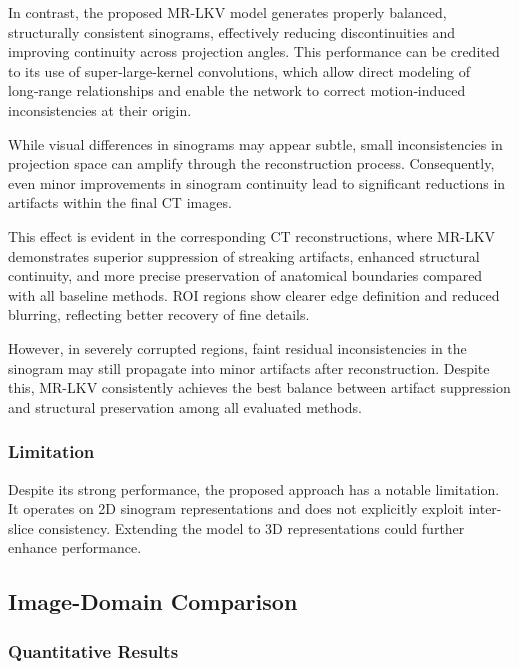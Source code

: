  In contrast, the proposed MR-LKV model generates properly balanced, structurally consistent sinograms, effectively reducing discontinuities and improving continuity across projection angles. This performance can be credited to its use of super‑large-kernel convolutions, which allow direct modeling of long‑range relationships and enable the network to correct motion‑induced inconsistencies at their origin.

 While visual differences in sinograms may appear subtle, small inconsistencies in projection space can amplify through the reconstruction process. Consequently, even minor improvements in sinogram continuity lead to significant reductions in artifacts within the final CT images.

 This effect is evident in the corresponding CT reconstructions, where MR-LKV demonstrates superior suppression of streaking artifacts, enhanced structural continuity, and more precise preservation of anatomical boundaries compared with all baseline methods. ROI regions show clearer edge definition and reduced blurring, reflecting better recovery of fine details.

However, in severely corrupted regions, faint residual inconsistencies in the sinogram may still propagate into minor artifacts after reconstruction. Despite this, MR-LKV consistently achieves the best balance between artifact suppression and structural preservation among all evaluated methods.


 

 \subsubsection{Limitation}
Despite its strong performance, the proposed approach has a notable limitation.
It operates on 2D sinogram representations and does not explicitly exploit inter-slice consistency. Extending the model to 3D representations could further enhance performance. 

\subsection{Image-Domain Comparison}


\subsubsection{Quantitative Results}

